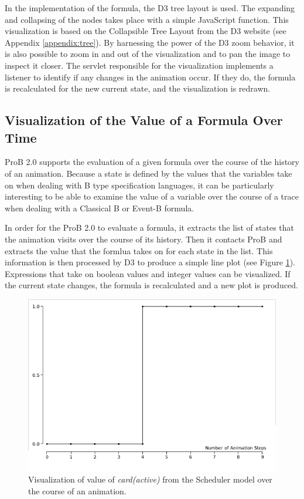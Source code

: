 In the implementation of the formula, the D3 tree layout is used. The expanding and collapsing of the nodes takes place with a simple JavaScript function. This visualization is based on the Collapsible Tree Layout from the D3 website (see Appendix \ref{appendix:tree}). By harnessing the power of the D3 zoom behavior, it is also possible to zoom in and out of the visualization and to pan the image to inspect it closer. The servlet responsible for the visualization implements a listener to identify if any changes in the animation occur. If they do, the formula is recalculated for the new current state, and the visualization is redrawn.

\subsection{Visualization of the Value of a Formula Over Time}

ProB 2.0 supports the evaluation of a given formula over the course of the history of an animation.
Because a state is defined by the values that the variables take on when dealing with B type specification languages, it can be particularly interesting to be able to examine the value of a variable over the course of a trace when dealing with a Classical B or Event-B formula. 

In order for the ProB 2.0 to evaluate a formula, it extracts the list of states that the animation visits over the course of its history. Then it contacts ProB and extracts the value that the formlua takes on for each state in the list. This information is then processed by D3 to produce a simple line plot (see Figure \ref{timeVsValue}). Expressions that take on boolean values and integer values can be visualized. If the current state changes, the formula is recalculated and a new plot is produced.

\begin{center}
\begin{figure}[h!]
\includegraphics[width=14cm]{bilder/timeVsValue.png}
\caption{Visualization of value of \emph{card(active)} from the Scheduler model over the course of an animation.}
\label{timeVsValue}
\end{figure}
\end{center}

